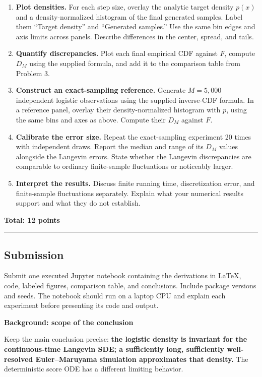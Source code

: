 \documentclass[11pt,a4paper]{article}
\providecommand{\tightlist}{\setlength{\itemsep}{0pt}\setlength{\parskip}{0pt}}
\begin{document}
\begin{enumerate}
\def\labelenumi{\arabic{enumi}.}
\tightlist
\item
  \textbf{Plot densities.} For each step size, overlay the analytic
  target density \(p(x)\) and a density-normalized histogram of the
  final generated samples. Label them ``Target density'' and ``Generated
  samples.'' Use the same bin edges and axis limits across panels.
  Describe differences in the center, spread, and tails.
\item
  \textbf{Quantify discrepancies.} Plot each final empirical CDF against
  \(F\), compute \(D_M\) using the supplied formula, and add it to the
  comparison table from Problem 3.
\item
  \textbf{Construct an exact-sampling reference.} Generate \(M=5{,}000\)
  independent logistic observations using the supplied inverse-CDF
  formula. In a reference panel, overlay their density-normalized
  histogram with \(p\), using the same bins and axes as above. Compute
  their \(D_M\) against \(F\).
\item
  \textbf{Calibrate the error size.} Repeat the exact-sampling
  experiment 20 times with independent draws. Report the median and
  range of its \(D_M\) values alongside the Langevin errors. State
  whether the Langevin discrepancies are comparable to ordinary
  finite-sample fluctuations or noticeably larger.
\item
  \textbf{Interpret the results.} Discuss finite running time,
  discretization error, and finite-sample fluctuations separately.
  Explain what your numerical results support and what they do not
  establish.
\end{enumerate}

\noindent\textbf{Total: 12 points}

\bigskip\hrule\bigskip

\subsection{Submission}\label{submission}

Submit one executed Jupyter notebook containing the derivations in
LaTeX, code, labeled figures, comparison table, and conclusions. Include
package versions and seeds. The notebook should run on a laptop CPU and
explain each experiment before presenting its code and output.

\par\noindent\textbf{Background: scope of the conclusion}\par\nopagebreak[4]
Keep the main conclusion precise: \textbf{the logistic density is
invariant for the continuous-time Langevin SDE; a sufficiently long,
sufficiently well-resolved Euler--Maruyama simulation approximates that
density.} The deterministic score ODE has a different limiting behavior.
\end{document}
